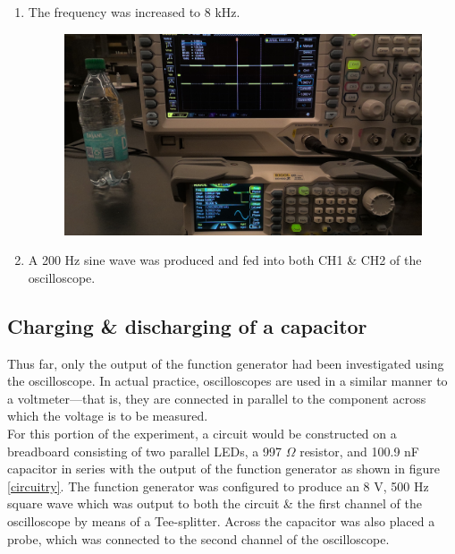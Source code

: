 \documentclass{article}
\begin{document}
\begin{enumerate}[label=(\alph*)]
                \item The frequency was increased to 8 kHz.
                \begin{figure}
                    \includegraphics[width=\textwidth/2]{f.jpg}
                    \caption{}
                \end{figure}

                \item A 200 Hz sine wave was produced and fed into both CH1 \& CH2 of the oscilloscope.
                \begin{figure}
                    
                \end{figure}
            \end{enumerate}




    \subsection{Charging \& discharging of a capacitor}
        Thus far, only the output of the function generator had been investigated using the oscilloscope. In actual practice, oscilloscopes are used in a similar manner to a voltmeter---that is, they are connected in parallel to the component across which the voltage is to be measured.\\ %
        For this portion of the experiment, a circuit would be constructed on a breadboard consisting of two parallel LEDs, a 997 $\Omega$ resistor, and 100.9 nF capacitor in series with the output of the function generator as shown in figure \ref{circuitry}.
        The function generator was configured to produce an 8 V, 500 Hz square wave which was output to both the circuit \& the first channel of the oscilloscope by means of a Tee-splitter.
        Across the capacitor was also placed a probe, which was connected to the second channel of the oscilloscope.\\
\end{document}
